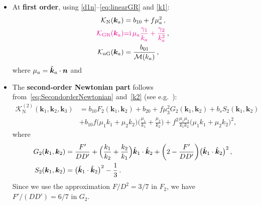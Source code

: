 {{{%
\begin{itemize}
\item
At {\bfseries first order}, using \eqref{d1n}--\eqref{eq:linearGR} and \eqref{k1}:
\begin{align}
\mathcal{K}_{\mathrm{N}}(\bm{k}_{a}) &= b_{10}+f\mu_a^{2}\,,
\label{kn} \\ 
{\color{magenta}{\mathcal{K}_{\mathrm{GR}}(\bm{k}_{a})}} &{\color{magenta}{=}} {\color{magenta}{\mathrm{i}\,\mu_{a} \frac{\gamma_{1}}{k_{a}} + \frac{\gamma_{2}}{k_{a}^{2}}}}\,,  \label{e2.21}\\
\mathcal{K}_{\mathrm{nG}}(\bm{k}_a) &= \frac{b_{01}}{{\cal M}(k_a)}\,, \label{e2.14} 
\end{align}
where   $\mu_a=\hat{\bm {k}}_a\cdot\bm {n}$ and 

\item
The  {\bfseries second-order Newtonian part} follows from~\eqref{eq:SecondorderNewtonian} and~\eqref{k2} (see e.g.~\cite{Tellarini:2016sgp}): 
\begin{align}
\mathcal{K}^{(2)}_{\mathrm{N}}(\bm{k}_{1}, \bm{k}_{2},\bm{k}_3) &= b_{10}F_{2}(\bm{k}_{1}, \bm{k}_{2}) + b_{20} + f\mu_{3}^{2}G_{2}(\bm{k}_{1}, \bm{k}_{2}) + b_{s}S_{2}(\bm{k}_{1}, \bm{k}_{2}) 
 \label{e2.15}\\ &
+b_{10}{f \big(\mu_1k_1+\mu_2k_2\big)\Big(\frac{\mu_1}{k_1} + \frac{\mu_2}{k_2} \Big)} 
+  f^2 \frac{\mu_1\mu_2}{k_1k_2}\big( \mu_1k_1+\mu_2k_2\big)^2 ,
\nonumber 
\end{align}
where
\begin{align}
G_{2}(\bm{k}_{1},\bm{k}_{2}) &= \frac{F'}{DD'}+ \Big( \frac{k_1}{k_2}+ \frac{k_2}{k_1}\Big)\hat{\bm {k}}_1\cdot \hat{\bm {k}}_2 +\bigg(2 - \frac{F'}{DD'}\bigg)\big( \hat{\bm {k}}_1\cdot \hat{\bm {k}}_2\big)^2\,, \label{g2k}
\\
S_{2}(\bm{k}_{1}, \bm{k}_{2}) &= \big( \hat{\bm {k}}_1\cdot \hat{\bm {k}}_2\big)^2- \frac{1}{3}\,. \label{e2.18}
\end{align}
Since we use the approximation $F/D^2=3/7$ in $F_2$,  we have $F'/(DD')=6/7$ in $G_2$.


\end{itemize}}}}
